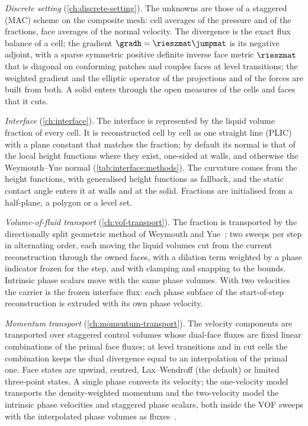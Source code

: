 \emph{Discrete setting} (\cref{ch:discrete-setting}). The unknowns are those
of a staggered (MAC) scheme on the composite mesh: cell averages of the
pressure and of the fractions, face averages of the normal velocity. The
divergence is the exact flux balance of a cell; the gradient
$\gradh=\rieszmat\jumpmat$ is its negative adjoint, with a sparse symmetric
positive definite inverse face metric $\rieszmat$ that is diagonal on
conforming patches and couples faces at level transitions; the weighted
gradient and the elliptic operator of the projections and of the forces are
built from both. A solid enters through the open measures of the cells and
faces that it cuts.

\emph{Interface} (\cref{ch:interface}). The interface is represented by the
liquid volume fraction of every cell. It is reconstructed cell by cell as
one straight line (PLIC) with a plane constant that matches the fraction;
by default its normal is that of the local height functions where they exist,
one-sided at walls, and otherwise the Weymouth--Yue normal
(\cref{tab:interface:methods}). The curvature comes from the height
functions, with generalised height functions as fallback, and the static
contact angle enters it at walls and at the solid. Fractions are initialised
from a half-plane, a polygon or a level set.

\emph{Volume-of-fluid transport} (\cref{ch:vof-transport}). The fraction is
transported by the directionally split geometric method of Weymouth and
Yue~\cite{weymouth2010}: two sweeps per step in alternating order, each
moving the liquid volumes cut from the current reconstruction through the
owned faces, with a dilation term weighted by a phase indicator frozen for
the step, and with clamping and snapping to the bounds. Intrinsic phase
scalars move with the same phase volumes. With two velocities the carrier is
the frozen interface flux: each phase subface of the start-of-step
reconstruction is extruded with its own phase velocity.

\emph{Momentum transport} (\cref{ch:momentum-transport}). The velocity
components are transported over staggered control volumes whose dual-face
fluxes are fixed linear combinations of the primal face fluxes; at level
transitions and in cut cells the combination keeps the dual divergence equal
to an interpolation of the primal one. Face states are upwind, centred,
Lax--Wendroff (the default) or limited three-point states. A single phase
convects its velocity; the one-velocity model transports the
density-weighted momentum and the two-velocity model the intrinsic phase
velocities and staggered phase scalars, both inside the VOF sweeps with the
interpolated phase volumes as fluxes~.

